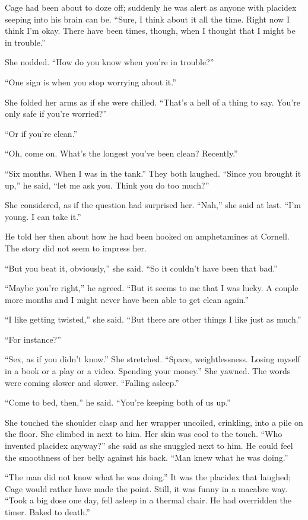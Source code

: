 Cage had been about to doze off; suddenly he was alert as anyone with placidex seeping into his brain can be. “Sure, I think about it all the time. Right now I think I’m okay. There have been times, though, when I thought that I might be in trouble.”

She nodded. “How do you know when you’re in trouble?”

“One sign is when you stop worrying about it.”

She folded her arms as if she were chilled. “That’s a hell of a thing to say. You’re only safe if you’re worried?”

“Or if you’re clean.”

“Oh, come on. What’s the longest you’ve been clean? Recently.”

“Six months. When I was in the tank.” They both laughed. “Since you brought it up,” he said, “let me ask you. Think you do too much?”

She considered, as if the question had surprised her. “Nah,” she said at last. “I’m young. I can take it.”

He told her then about how he had been hooked on amphetamines at Cornell. The story did not seem to impress her.

“But you beat it, obviously,” she said. “So it couldn’t have been that bad.”

“Maybe you’re right,” he agreed. “But it seems to me that I was lucky. A couple more months and I might never have been able to get clean again.”

“I like getting twisted,” she said. “But there are other things I like just as much.”

“For instance?”

“Sex, as if you didn’t know.” She stretched. “Space, weightlessness. Losing myself in a book or a play or a video. Spending your money.” She yawned. The words were coming slower and slower. “Falling asleep.”

“Come to bed, then,” he said. “You’re keeping both of us up.”

She touched the shoulder clasp and her wrapper uncoiled, crinkling, into a pile on the floor. She climbed in next to him. Her skin was cool to the touch. “Who invented placidex anyway?” she said as she snuggled next to him. He could feel the smoothness of her belly against his back. “Man knew what he was doing.”

“The man did not know what he was doing.” It was the placidex that laughed; Cage would rather have made the point. Still, it was funny in a macabre way. “Took a big dose one day, fell asleep in a thermal chair. He had overridden the timer. Baked to death.”

